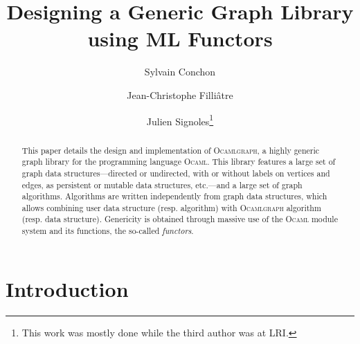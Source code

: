 \documentclass[tfpsymp,pagenumbers]{tfp07symp}
\newcommand{\ocamlgraph}{\textsc{Ocamlgraph}\xspace}
\newcommand{\ocaml}{\textsc{Ocaml}\xspace}
\begin{document}
\title{Designing a Generic Graph Library \\ using ML Functors}

\author
    {Sylvain Conchon \and 
     Jean-Christophe Filli\^atre \and 
     Julien Signoles\protect\footnote[1]{This work was mostly done
    while the third author was at LRI.}}





\maketitle

\begin{abstract}
  This paper details the design and implementation of \ocamlgraph, a
  highly generic graph library for the programming language \ocaml.
  This library features a large set of graph data
  structures---directed or undirected, with or without labels on
  vertices and edges, as persistent or mutable data structures,
  etc.---and a large set of graph algorithms.  Algorithms are written
  independently from graph data structures, which allows combining
  user data structure (resp. algorithm) with \ocamlgraph algorithm
  (resp. data structure).  Genericity is obtained through massive use
  of the \ocaml module system and its functions, the so-called
  \emph{functors}.
\end{abstract}




\section{Introduction}
\end{document}
